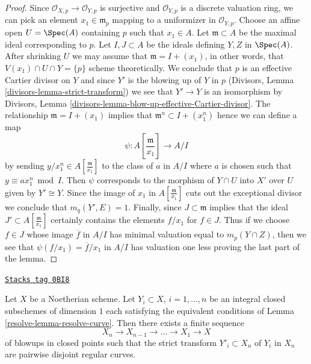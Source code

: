 \begin{proof}
Since $\mathcal{O}_{X, p} \to \mathcal{O}_{Y, p}$ is surjective and
$\mathcal{O}_{Y, p}$ is a discrete valuation ring, we can pick an
element $x_1 \in \mathfrak m_p$ mapping to a uniformizer in
$\mathcal{O}_{Y, p}$. Choose an affine open $U = \Spec(A)$ containing
$p$ such that $x_1 \in A$. Let $\mathfrak m \subset A$ be the
maximal ideal corresponding to $p$. Let $I, J \subset A$
be the ideals defining $Y, Z$ in $\Spec(A)$. After shrinking $U$
we may assume that $\mathfrak m = I + (x_1)$, in other words,
that $V(x_1) \cap U \cap Y = \{p\}$ scheme theoretically.
We conclude that $p$ is an effective Cartier divisor on $Y$ and
since $Y'$ is the blowing up of $Y$ in $p$
(Divisors, Lemma \ref{divisors-lemma-strict-transform})
we see that $Y' \to Y$ is an isomorphism by
Divisors, Lemma \ref{divisors-lemma-blow-up-effective-Cartier-divisor}.
The relationship $\mathfrak m = I + (x_1)$ implies that
$\mathfrak m^n \subset I + (x_1^n)$ hence we can define a map
$$
\psi : A[\textstyle{\frac{\mathfrak m}{x_1}}] \longrightarrow A/I
$$
by sending $y/x_1^n \in A[\frac{\mathfrak m}{x_1}]$
to the class of $a$ in $A/I$ where $a$
is chosen such that $y \equiv ax_1^n \bmod I$.
Then $\psi$ corresponds to the morphism of $Y \cap U$ into $X'$
over $U$ given by $Y' \cong Y$. Since the image of $x_1$
in $A[\frac{\mathfrak m}{x_1}]$ cuts out the exceptional divisor
we conclude that $m_q(Y', E) = 1$. Finally, since
$J \subset \mathfrak m$ implies that the ideal
$J' \subset A[\frac{\mathfrak m}{x_1}]$ certainly
contains the elements $f/x_1$ for $f \in J$.
Thus if we choose $f \in J$ whose image $\overline{f}$ in $A/I$ has
minimal valuation equal to $m_p(Y \cap Z)$, then we see that
$\psi(f/x_1) = \overline{f}/x_1$ in $A/I$ has valuation one less
proving the last part of the lemma.
\end{proof}

\begin{lemma}
\label{resolve-lemma-blowup-curves}
\href{https://stacks.math.columbia.edu/tag/0BI8}{\texttt{Stacks tag 0BI8}}

Let $X$ be a Noetherian scheme. Let $Y_i \subset X$, $i = 1, \ldots, n$
be an integral closed subschemes of dimension $1$ each satisfying the
equivalent conditions of Lemma \ref{resolve-lemma-resolve-curve}. Then there
exists a finite sequence
$$
X_n \to X_{n - 1} \to \ldots \to X_1 \to X
$$
of blowups in closed points such that the strict transform $Y'_i \subset X_n$
of $Y_i$ in $X_n$ are pairwise disjoint regular curves.
\end{lemma}

